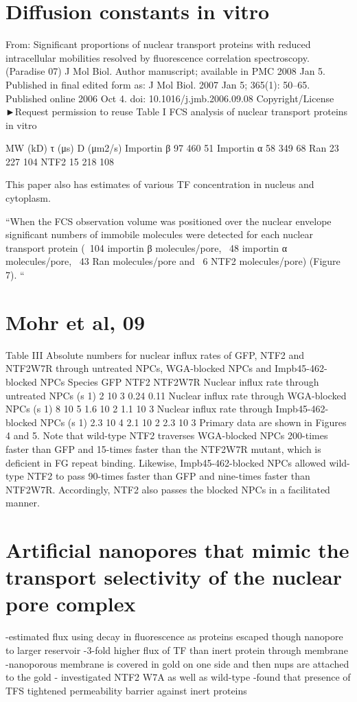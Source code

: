 \section{Diffusion constants in vitro}

From: Significant proportions of nuclear transport proteins with reduced intracellular mobilities resolved by fluorescence correlation spectroscopy. (Paradise 07)
J Mol Biol. Author manuscript; available in PMC 2008 Jan 5.
Published in final edited form as:
J Mol Biol. 2007 Jan 5; 365(1): 50–65.
Published online 2006 Oct 4. doi: 10.1016/j.jmb.2006.09.08
Copyright/License ►Request permission to reuse
Table I
FCS analysis of nuclear transport proteins in vitro

MW (kD)	τ (μs)	D (μm2/s)
Importin β	97	460	51
Importin α	58	349	68
Ran	23	227	104
NTF2	15	218	108

This paper also has estimates of various TF concentration in nucleus and cytoplasm.

``When the FCS observation volume was positioned over the nuclear envelope significant numbers of immobile molecules were detected for each nuclear transport protein (~104 importin β molecules/pore, ~48 importin α molecules/pore, ~43 Ran molecules/pore and ~6 NTF2 molecules/pore) (Figure 7). ``

\section{Mohr et al, 09}
Table III Absolute numbers for nuclear influx rates of GFP, NTF2 and NTF2W7R through untreated NPCs, WGA-blocked NPCs and Impb45-462-blocked NPCs
 Species
GFP NTF2 NTF2W7R
Nuclear influx rate through untreated NPCs (s 1)
2  10 3 0.24 0.11
Nuclear influx rate through WGA-blocked NPCs (s 1)
8  10 5 1.6  10 2 1.1  10 3
Nuclear influx rate through Impb45-462-blocked NPCs (s 1)
2.3  10 4 2.1  10 2 2.3  10 3
    Primary data are shown in Figures 4 and 5. Note that wild-type NTF2 traverses WGA-blocked NPCs 200-times faster than GFP and 15-times faster than the NTF2W7R mutant, which is deficient in FG repeat binding. Likewise, Impb45-462-blocked NPCs allowed wild-type NTF2 to pass 90-times faster than GFP and nine-times faster than NTF2W7R. Accordingly, NTF2 also passes the blocked NPCs in a facilitated manner.

\section{Artificial nanopores that mimic the transport selectivity of the nuclear pore complex}
-estimated flux using decay in fluorescence as proteins escaped though nanopore to larger reservoir
-3-fold higher flux of TF than inert protein through membrane
-nanoporous membrane is covered in gold on one side and then nups are attached to the gold
- investigated NTF2 W7A as well as wild-type
-found that presence of TFS tightened permeability barrier against inert proteins













